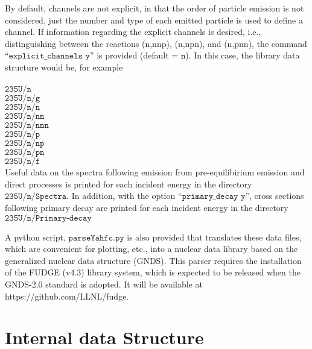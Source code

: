 \documentclass[
10pt,
showpacs,preprintnumbers,footinbib,
amsfonts,amsmath,amssymb,
aps,
prc,twocolumn,groupedaddress,superscriptaddress,
showkeys,
nofootinbib
]{revtex4-1}
\begin{document}
By default, channels are not explicit, in that the order of particle emission is not considered, just the number and type of each emitted particle is used to define a channel. If information regarding the explicit channels is desired, i.e., distinguishing between the reactions (n,nnp), (n,npn), and (n,pnn), the command ``${\texttt{explicit\_channels y}}$'' is provided (default = ${\texttt{n}}$). In this case, the library data structure would be, for example\\
\\
${\texttt{235U/n}}$\\
${\texttt{235U/n/g}}$\\
${\texttt{235U/n/n}}$\\
${\texttt{235U/n/nn}}$\\
${\texttt{235U/n/nnn}}$\\
${\texttt{235U/n/p}}$\\
${\texttt{235U/n/np}}$\\
${\texttt{235U/n/pn}}$\\
${\texttt{235U/n/f}}$\\

Useful data on the spectra following emission from pre-equilibirium emission and direct processes is printed for each incident energy in the directory ${\texttt{235U/n/Spectra}}$. In addition, with the option ``${\texttt{primary\_decay y}}$'', cross sections following primary decay are printed for each incident energy in the directory ${\texttt{235U/n/Primary-decay}}$

A python script, ${\texttt{parseYahfc.py}}$ is also provided that translates these data files, which are convenient for plotting, etc., into a nuclear data library based on the generalized nuclear data structure (GNDS). This parser requires the installation of the FUDGE (v4.3) library system, which is expected to be released when the GNDS-2.0 standard is adopted. It will be available at  https://github.com/LLNL/fudge.

\section{Internal data Structure}
\end{document}
